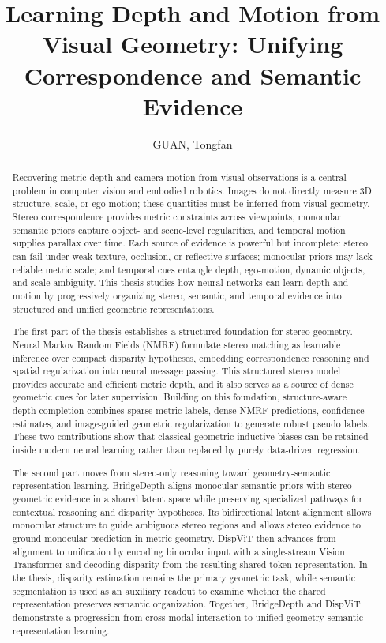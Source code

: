 \documentclass[11pt]{gsasthesis} %
\title{Learning Depth and Motion from Visual Geometry: Unifying Correspondence and Semantic Evidence} %
\author{GUAN, Tongfan} %
\begin{document}


\thesistitlepage
\committeepage
\begin{abstract}
Recovering metric depth and camera motion from visual observations is a central problem in computer vision and embodied robotics.
Images do not directly measure 3D structure, scale, or ego-motion; these quantities must be inferred from visual geometry.
Stereo correspondence provides metric constraints across viewpoints, monocular semantic priors capture object- and scene-level regularities, and temporal motion supplies parallax over time.
Each source of evidence is powerful but incomplete: stereo can fail under weak texture, occlusion, or reflective surfaces; monocular priors may lack reliable metric scale; and temporal cues entangle depth, ego-motion, dynamic objects, and scale ambiguity.
This thesis studies how neural networks can learn depth and motion by progressively organizing stereo, semantic, and temporal evidence into structured and unified geometric representations.

The first part of the thesis establishes a structured foundation for stereo geometry.
Neural Markov Random Fields (NMRF) formulate stereo matching as learnable inference over compact disparity hypotheses, embedding correspondence reasoning and spatial regularization into neural message passing.
This structured stereo model provides accurate and efficient metric depth, and it also serves as a source of dense geometric cues for later supervision.
Building on this foundation, structure-aware depth completion combines sparse metric labels, dense NMRF predictions, confidence estimates, and image-guided geometric regularization to generate robust pseudo labels.
These two contributions show that classical geometric inductive biases can be retained inside modern neural learning rather than replaced by purely data-driven regression.

The second part moves from stereo-only reasoning toward geometry-semantic representation learning.
BridgeDepth aligns monocular semantic priors with stereo geometric evidence in a shared latent space while preserving specialized pathways for contextual reasoning and disparity hypotheses.
Its bidirectional latent alignment allows monocular structure to guide ambiguous stereo regions and allows stereo evidence to ground monocular prediction in metric geometry.
DispViT then advances from alignment to unification by encoding binocular input with a single-stream Vision Transformer and decoding disparity from the resulting shared token representation.
In the thesis, disparity estimation remains the primary geometric task, while semantic segmentation is used as an auxiliary readout to examine whether the shared representation preserves semantic organization.
Together, BridgeDepth and DispViT demonstrate a progression from cross-modal interaction to unified geometry-semantic representation learning.


\end{abstract}
\end{document}
